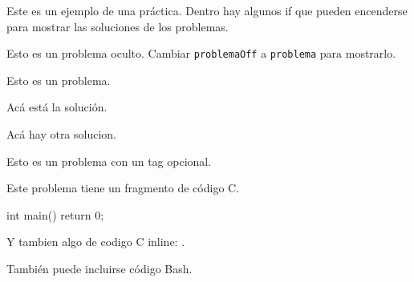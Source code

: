\documentclass{lcc}
\begin{document}
\maketitle

Este es un ejemplo de una práctica. Dentro hay algunos if que pueden
encenderse para mostrar las soluciones de los problemas.

\begin{problemaOff}
    Esto es un problema oculto. Cambiar \texttt{problemaOff} a
    \texttt{problema} para mostrarlo.
\end{problemaOff}

\begin{problema}
    Esto es un problema.
    \begin{solucion}
        Acá está la solución.
    \end{solucion}
    \begin{solucion}[variante 2]
        Acá hay otra solucion.
    \end{solucion}
\end{problema}

\begin{problema}[(díficil)]
    Esto es un problema con un tag opcional.
\end{problema}

\begin{problema}
    Este problema tiene un fragmento de código C.
    \begin{C}
int main()
{
    return 0;
}
    \end{C}
    Y tambien algo de codigo C inline: .
\end{problema}

\begin{problema}
    También puede incluirse código Bash.
\end{problema}
\end{document}
